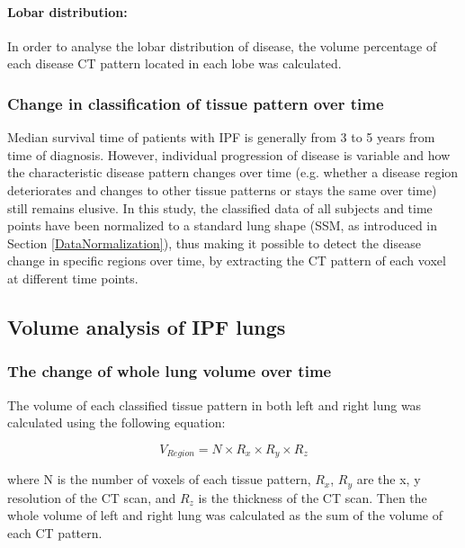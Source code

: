 \paragraph{Lobar distribution:} In order to analyse the lobar distribution of disease, the volume percentage of each disease CT pattern located in each lobe was calculated.

\subsubsection{Change in classification of tissue pattern over time}
Median survival time of patients with IPF is generally from 3 to 5 years from time of diagnosis. However, individual progression of disease is variable and how the characteristic disease pattern changes over time (e.g. whether a disease region deteriorates and changes to other tissue patterns or stays the same over time) still remains elusive. In this study, the classified data of all subjects and time points have been normalized to a standard lung shape (SSM, as introduced in Section \ref{DataNormalization}), thus making it possible to detect the disease change in specific regions over time, by extracting the CT pattern of each voxel at different time points.

\subsection{Volume analysis of IPF lungs} \label{VolumeAnalysis}
\subsubsection{The change of whole lung volume over time}
The volume of each classified tissue pattern in both left and right lung was calculated using the following equation:

\begin{equation}
V_{Region} = N \times R_x \times R_y \times R_z
\end{equation}

\noindent where N is the number of voxels of each tissue pattern, $R_{x}$, $R_{y}$ are the x, y resolution of the CT scan, and $R_{z}$ is the thickness of the CT scan. Then the whole volume of left and right lung was calculated as the sum of the volume of each CT pattern.



